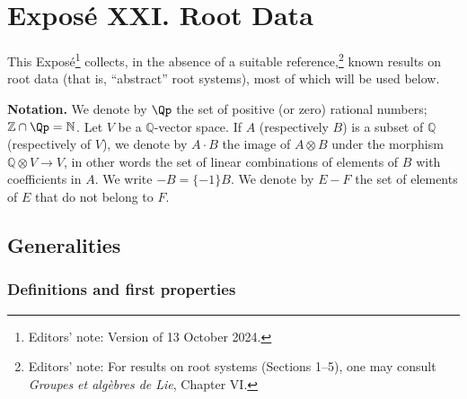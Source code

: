 
\chapter*{Exposé XXI. Root Data}

\noindent
This Exposé\footnote{Editors' note: Version of 13 October 2024.}
collects, in the absence of a suitable reference,\footnote{%
Editors' note: For results on root systems (Sections 1--5), one may
consult \emph{Groupes et algèbres de Lie}, Chapter VI.}
known results on root data (that is, ``abstract'' root systems), most of
which will be used below.

\medskip
\noindent\textbf{Notation.}
We denote by \(\Qp\) the set of positive (or zero) rational numbers;
\(\mathbb Z\cap\Qp=\mathbb N\). Let \(V\) be a \(\mathbb Q\)-vector
space. If \(A\) (respectively \(B\)) is a subset of \(\mathbb Q\)
(respectively of \(V\)), we denote by \(A\cdot B\) the image of
\(A\otimes B\) under the morphism
\(\mathbb Q\otimes V\to V\), in other words the set of linear
combinations of elements of \(B\) with coefficients in \(A\). We write
\(-B=\{-1\}B\). We denote by \(E-F\) the set of elements of \(E\)
that do not belong to \(F\).

\section{Generalities}

\subsection{Definitions and first properties}

